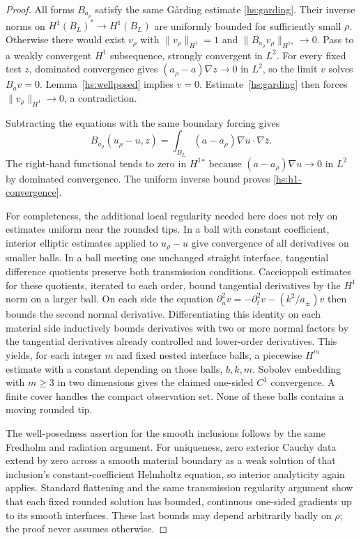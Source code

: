 \begin{proof}
All forms $B_{a_\rho}$ satisfy the same G\aa rding estimate
\eqref{hs:garding}.  Their inverse norms on
$H^1(B_L)^*\to H^1(B_L)$ are uniformly bounded for sufficiently
small $\rho$.  Otherwise there would exist $v_\rho$ with
$\|v_\rho\|_{H^1}=1$ and
$\|B_{a_\rho}v_\rho\|_{H^1{}^*}\to0$.
Pass to a weakly convergent $H^1$ subsequence, strongly convergent
in $L^2$.  For every fixed test $z$, dominated convergence gives
$(a_\rho-a)\nabla z\to0$ in $L^2$, so the limit $v$ solves
$B_av=0$.  Lemma~\ref{hs:wellposed} implies $v=0$.
Estimate~\eqref{hs:garding} then forces
$\|v_\rho\|_{H^1}\to0$, a contradiction.

Subtracting the equations with the same boundary forcing gives
\begin{equation}
 B_{a_\rho}(u_\rho-u,z)
 =\int_{B_L}(a-a_\rho)\nabla u\cdot\nabla\overline z.
 \label{hs:rounding-difference}
\end{equation}
The right-hand functional tends to zero in $H^1{}^*$ because
$(a-a_\rho)\nabla u\to0$ in $L^2$ by dominated convergence.
The uniform inverse bound proves \eqref{hs:h1-convergence}.

For completeness, the additional local regularity needed here does
not rely on estimates uniform near the rounded tips.  In a ball
with constant coefficient, interior elliptic estimates applied to
$u_\rho-u$ give convergence of all derivatives on smaller balls.
In a ball meeting one unchanged straight interface, tangential
difference quotients preserve both transmission conditions.
Caccioppoli estimates for these quotients, iterated to each order,
bound tangential derivatives by the $H^1$ norm on a larger ball.
On each side the equation
$\partial_n^2v=-\partial_t^2v-(k^2/a_\pm)v$
then bounds the second normal derivative.  Differentiating this
identity on each material side inductively bounds derivatives with
two or more normal factors by the tangential derivatives already
controlled and lower-order derivatives.  This yields, for
each integer $m$ and fixed nested interface balls, a piecewise
$H^m$ estimate with a constant depending on those balls, $b,k,m$.
Sobolev embedding with $m\geq3$ in two dimensions gives the claimed
one-sided $C^1$ convergence.  A finite cover handles the compact
observation set.  None of these balls contains a moving rounded tip.

The well-posedness assertion for the smooth inclusions follows by
the same Fredholm and radiation argument.  For uniqueness, zero
exterior Cauchy data extend by zero across a smooth material boundary
as a weak solution of that inclusion's constant-coefficient
Helmholtz equation, so interior analyticity again applies.  Standard
flattening and the same transmission regularity argument show that
each fixed rounded solution has bounded, continuous one-sided
gradients up to its smooth interfaces.  These last bounds may depend
arbitrarily badly on $\rho$; the proof never assumes otherwise.
\end{proof}

